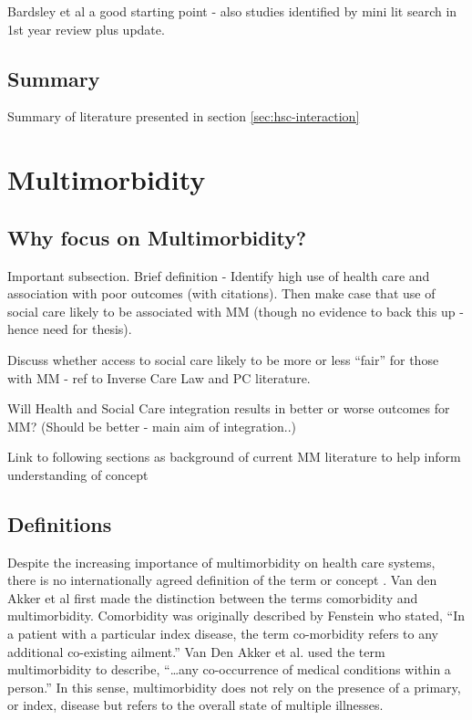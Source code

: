 \documentclass[12pt,]{report}
\begin{document}
Bardsley et al\citeyearpar{RN183} a good starting point - also studies
identified by mini lit search in 1st year review plus update.

\subsection{Summary}\label{subsec:hsc-interaction-summary}

Summary of literature presented in section \ref{sec:hsc-interaction}

\section{Multimorbidity}\label{sec:mm}

\subsection{Why focus on Multimorbidity?}\label{subsec:why-mm}

Important subsection. Brief definition - Identify high use of health
care and association with poor outcomes (with citations). Then make case
that use of social care likely to be associated with MM (though no
evidence to back this up - hence need for thesis).

Discuss whether access to social care likely to be more or less ``fair''
for those with MM - ref to Inverse Care Law and PC literature.

Will Health and Social Care integration results in better or worse
outcomes for MM? (Should be better - main aim of integration..)

Link to following sections as background of current MM literature to
help inform understanding of concept

\subsection{Definitions}\label{subsec:mm-defs}

Despite the increasing importance of multimorbidity on health care
systems, there is no internationally agreed definition of the term or
concept \citep{RN89, RN95}. Van den Akker et al \citeyearpar{RN19} first
made the distinction between the terms comorbidity and multimorbidity.
Comorbidity was originally described by Fenstein \citep[pp.467]{RN338}
who stated, ``In a patient with a particular index disease, the term
co-morbidity refers to any additional co-existing ailment.'' Van Den
Akker et al. \citeyearpar[pp.65]{RN19} used the term multimorbidity to
describe, ``\ldots{}any co-occurrence of medical conditions within a
person.'' In this sense, multimorbidity does not rely on the presence of
a primary, or index, disease but refers to the overall state of multiple
illnesses.
\end{document}
